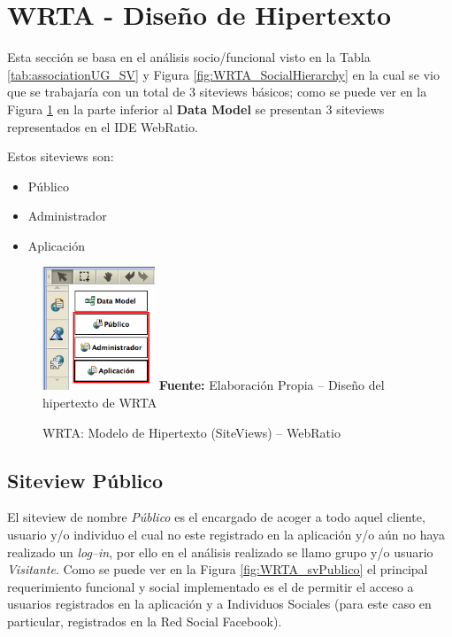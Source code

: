 \documentclass[oneside,12pt,a4paper]{memoir}%
\begin{document}
	 
	\section{WRTA - Dise\~no de Hipertexto}
	\label{sec:hypertextDesign}
	
	Esta secci\'on se basa en el an\'alisis socio/funcional visto
	en la Tabla \ref{tab:associationUG_SV} y Figura \ref{fig:WRTA_SocialHierarchy}
	en la cual se vio que se trabajar\'ia con un total de $3$ siteviews b\'asicos;
	como se puede ver en la Figura \ref{fig:WRTA_hypertextModel} en la parte
	inferior al \textbf{Data Model} se presentan $3$ siteviews representados en el
	\ac{IDE} WebRatio.
	
	Estos siteviews son:
	
	\begin{itemize}
	  \item P\'ublico
	  \item Administrador
	  \item Aplicaci\'on
	\end{itemize}
	
	\begin{figure}[here]
		\centering
		\caption{WRTA: Modelo de Hipertexto (SiteViews) -- WebRatio}
		\includegraphics[width=0.3\textwidth]{figure/fig_WRTA_hypertextModel.png}
		\newline
		\textbf{Fuente:} Elaboraci\'on Propia -- Dise\~no del hipertexto de WRTA
		\label{fig:WRTA_hypertextModel}
	\end{figure}	
	
	
		\subsection{Siteview P\'ublico}
		\label{ssec:svPublico}
			
			El siteview de nombre \textit{P\'ublico} es el encargado de acoger a todo
			aquel cliente, usuario y/o individuo el cual no este registrado en la
			aplicaci\'on y/o a\'un no haya realizado un \textit{log--in}, por ello
			en el an\'alisis realizado se llamo grupo y/o usuario \textit{Visitante}.
			Como se puede ver en la Figura \ref{fig:WRTA_svPublico} el principal
			requerimiento funcional y social implementado es el de permitir el acceso a
			usuarios registrados en la aplicaci\'on y a Individuos Sociales (para este
			caso en particular, registrados en la Red Social Facebook).
			
\end{document}
